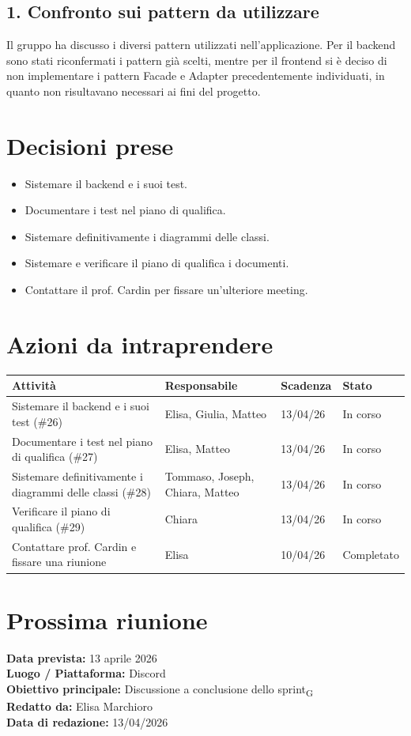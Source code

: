 \documentclass[a4paper,12pt]{article}
\newcommand{\gls}[1]{#1\textsubscript{G}}
\begin{document}
\subsection*{1. Confronto sui pattern da utilizzare}
Il gruppo ha discusso i diversi pattern utilizzati nell’applicazione. Per il backend sono stati riconfermati i pattern già scelti, mentre per il frontend si è deciso di non implementare i pattern Facade e Adapter precedentemente individuati, in quanto non risultavano necessari ai fini del progetto.


\section*{Decisioni prese}
\begin{itemize}
    \item Sistemare il backend e i suoi test.
    \item Documentare i test nel piano di qualifica.
    \item Sistemare definitivamente i diagrammi delle classi.
    \item Sistemare e verificare il piano di qualifica i documenti.
    \item Contattare il prof. Cardin per fissare un'ulteriore meeting.
\end{itemize}

\section*{Azioni da intraprendere}
\begin{longtable}{|p{}|p{}|p{}|p{}|}
\hline
\textbf{Attività} & \textbf{Responsabile} & \textbf{Scadenza} & \textbf{Stato} \\ \hline
Sistemare il backend e i suoi test (\#26) & Elisa, Giulia, Matteo & 13/04/26 & In corso \\ \hline
Documentare i test nel piano di qualifica (\#27) & Elisa, Matteo & 13/04/26 & In corso \\ \hline
Sistemare definitivamente i diagrammi delle classi (\#28) & Tommaso, Joseph, Chiara, Matteo & 13/04/26 & In corso \\ \hline
Verificare il piano di qualifica (\#29) & Chiara & 13/04/26 & In corso \\ \hline
Contattare prof. Cardin e fissare una riunione & Elisa & 10/04/26 & Completato\\ \hline
\end{longtable}


\section*{Prossima riunione}
\textbf{Data prevista:} 13 aprile 2026\\
\textbf{Luogo / Piattaforma:} Discord \\
\textbf{Obiettivo principale:} Discussione a conclusione dello \gls{sprint}\\



\textbf{Redatto da:} Elisa Marchioro \\
\textbf{Data di redazione:} 13/04/2026
\end{document}
